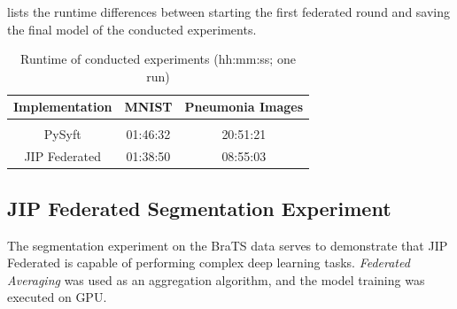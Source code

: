  lists the runtime differences between starting the first federated round and saving the final model of the conducted experiments.

\begin{table}[htbp]
  \centering
  \begin{tabular}{ccc}
  Implementation & MNIST & Pneumonia Images \\
  \hline \\[-2.5ex] %
  PySyft        & 01:46:32 & 20:51:21 \\
  JIP Federated & 01:38:50 & 08:55:03 \\
 \end{tabular}
 \caption{Runtime of conducted experiments (hh:mm:ss; one run)}
 \label{tab:RuntimeExp}
\end{table}






\subsection{JIP Federated Segmentation Experiment}
\label{subsec:ResultsSegmentation}

The segmentation experiment on the BraTS data serves to demonstrate that JIP Federated is capable of performing complex deep learning tasks. \textit{Federated Averaging} was used as an aggregation algorithm, and the model training was executed on GPU.

